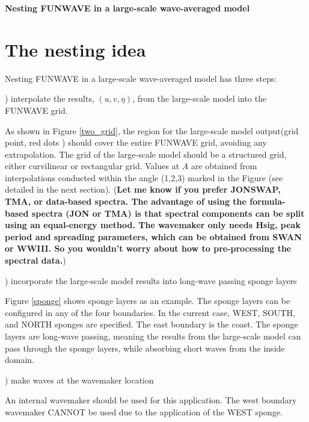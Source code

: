 \documentclass[preprint,10pt]{elsarticle}
\begin{document}

\begin{center}
{\bf \Large Nesting FUNWAVE in a large-scale wave-averaged model}
 \end{center}
 
 \section{The nesting idea }
 
 \noindent
 Nesting FUNWAVE in a large-scale wave-averaged model has three steps:
 
 \vspace{0.5cm}
 ) interpolate the results, $(u,v,\eta)$, from the large-scale model into the FUNWAVE grid. 
 
 As shown in Figure \ref{two_grid}, the region for the large-scale model output(grid point, red dots ) should cover the entire FUNWAVE grid, avoiding any extrapolation. The grid of the large-scale model should be a structured grid, either curvilinear or rectangular grid. Values at $A$ are obtained from interpolations conducted within the angle (1,2,3) marked in the Figure (see detailed in the next section).  ({\bf Let me know if you prefer JONSWAP, TMA, or data-based spectra. The advantage of using the formula-based spectra (JON or TMA) is that spectral components can be split using an equal-energy method. The wavemaker only needs Hsig, peak period and spreading parameters, which can be obtained from SWAN or WWIII. So you wouldn't worry about how to pre-processing the spectral data.})
 
  \vspace{0.5cm}
 ) incorporate the large-scale model results into long-wave passing sponge layers
 
 Figure \ref{sponge} shows sponge layers as an example. The sponge layers can be configured in any of the four boundaries. In the current case, WEST, SOUTH, and NORTH sponges are specified. The east boundary is the coast. The sponge layers are long-wave passing, meaning the results from the large-scale model can pass through the sponge layers, while absorbing short waves from the inside domain. 
 
  \vspace{0.5cm}
 ) make waves at the wavemaker location
 
 An internal wavemaker should be used for this application. The west boundary wavemaker CANNOT be used due to the application of the WEST sponge. 
 
\end{document}
